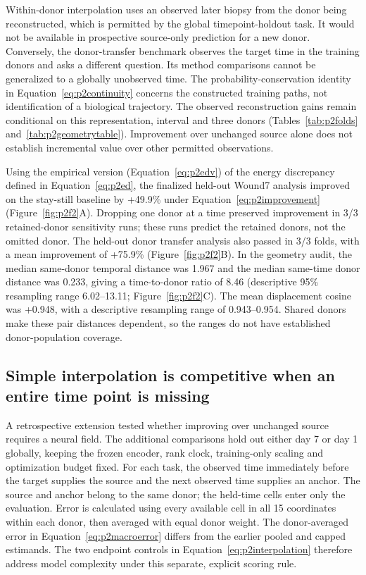 Within-donor interpolation uses an observed later biopsy from the donor being reconstructed, which is permitted by the global timepoint-holdout task. It would not be available in prospective source-only prediction for a new donor. Conversely, the donor-transfer benchmark observes the target time in the training donors and asks a different question. Its method comparisons cannot be generalized to a globally unobserved time. The probability-conservation identity in Equation~\eqref{eq:p2continuity} concerns the constructed training paths, not identification of a biological trajectory. The observed reconstruction gains remain conditional on this representation, interval and three donors (Tables~\ref{tab:p2folds} and~\ref{tab:p2geometrytable}). Improvement over unchanged source alone does not establish incremental value over other permitted observations.

\FloatBarrier
Using the empirical version (Equation~\eqref{eq:p2edv}) of the energy discrepancy defined in Equation~\eqref{eq:p2ed}, the finalized held-out Wound7 analysis improved on the stay-still baseline by +49.9\% under Equation~\eqref{eq:p2improvement} (Figure~\ref{fig:p2f2}A\label{call:p2f2}). Dropping one donor at a time preserved improvement in 3/3 retained-donor sensitivity runs; these runs predict the retained donors, not the omitted donor. The held-out donor transfer analysis also passed in 3/3 folds, with a mean improvement of +75.9\% (Figure~\ref{fig:p2f2}B). In the geometry audit, the median same-donor temporal distance was 1.967 and the median same-time donor distance was 0.233, giving a time-to-donor ratio of 8.46 (descriptive 95\% resampling range 6.02--13.11; Figure~\ref{fig:p2f2}C). The mean displacement cosine was +0.948, with a descriptive resampling range of 0.943--0.954. Shared donors make these pair distances dependent, so the ranges do not have established donor-population coverage.



\subsection{Simple interpolation is competitive when an entire time point is missing}

A retrospective extension tested whether improving over unchanged source requires a neural field. The additional comparisons hold out either day 7 or day 1 globally, keeping the frozen encoder, rank clock, training-only scaling and optimization budget fixed. For each task, the observed time immediately before the target supplies the source and the next observed time supplies an anchor. The source and anchor belong to the same donor; the held-time cells enter only the evaluation. Error is calculated using every available cell in all 15 coordinates within each donor, then averaged with equal donor weight. The donor-averaged error in Equation~\eqref{eq:p2macroerror} differs from the earlier pooled and capped estimands. The two endpoint controls in Equation~\eqref{eq:p2interpolation} therefore address model complexity under this separate, explicit scoring rule.

